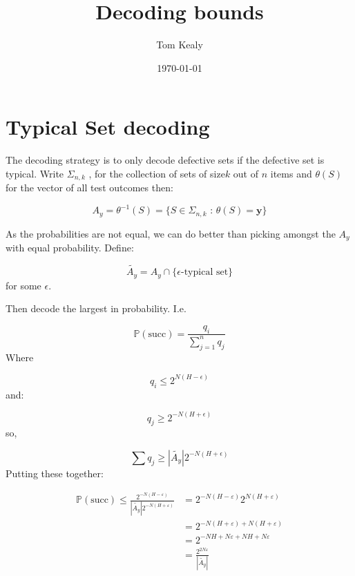 \documentclass[11pt]{article}
\begin{document}
\title{Decoding bounds}
\author{Tom Kealy}

\date{\today}

\maketitle
\section{Typical Set decoding}

The decoding strategy is to only decode defective sets if the defective set is typical. Write \(\Sigma_{n,k}\) , for the collection of sets of size\(k\) out of \(n\) items and \(\theta\left(S\right)\) for the vector of all test outcomes then:

\begin{equation}
\mathit{A_y} = \theta^{-1} \left(S\right) = \{ S \in \Sigma_{n,k} \text{ : } \theta\left(S\right) = \textbf{y} \}
\end{equation} 

As the probabilities are not equal, we can do better than picking amongst the \(\mathit{A_y}\) with equal probability. Define:

\begin{equation}
\tilde{\mathit{A_y}} = \mathit{A_y} \cap \{\epsilon\text{-typical set}\}
\end{equation}
for some \(\epsilon\). 

Then decode the largest in probability. I.e.

\begin{equation}
\mathbb{P}\left(\text{succ}\right) = \frac{q_i}{\sum_{j=1}^{n} q_j }
\end{equation}
Where

\begin{equation}
q_i \leq 2^{N\left(H-\epsilon\right)}
\end{equation}
and:

\begin{equation}
q_j \geq 2^{-N\left(H+\epsilon\right)}
\end{equation}
so,

\begin{equation}
\sum q_j \geq |\tilde{\mathit{A_y}}|2^{-N\left(H+\epsilon\right)}
\end{equation}
Putting these together:

\begin{align}
\mathbb{P}\left(\text{succ}\right) \leq 
\frac {2^{-N\left(H-\varepsilon\right)}} 
{|\tilde{\mathit{A_y}} |2^{-N\left(H+\varepsilon\right)}} 
&= 2^{-N(H-\varepsilon)} 2^{N(H+\varepsilon)} \\
&= 2^{-N(H+\varepsilon)+N(H+\varepsilon)}\\
&= 2^{-NH +N\varepsilon + NH +N\varepsilon}\\
&= \frac{2^{2N\varepsilon}}{|\tilde{\mathit{A_y}}|}
\end{align}
\end{document}
